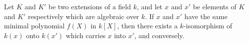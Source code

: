 Let $K$ and $K'$ be two extensions of a field $k$, and let $x$ and $x'$ be elements of $K$ and $K'$ respectively which are algebraic over $k$. If $x$ and $x'$ have the same minimal polynomial $f(X)$ in $k[X]$, then there exists a $k$-isomorphism of $k(x)$ onto $k(x')$ which carries $x$ into $x'$, and conversely.
